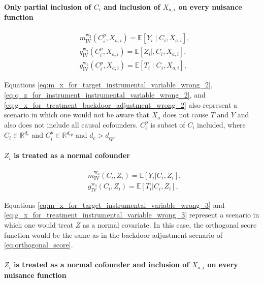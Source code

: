 \documentclass{article}
\numberwithin{equation}{section}
\begin{document}
\paragraph{Only partial inclusion of $C_i$ and inclusion of $X_{a, i}$ on every nuisance function}

\begin{align}
    & m_{\text{IV}}^{\text{w}_2}(C_i^{p}, X_{a, i}) = \mathbb{E}[Y_i \mid C_i, X_{a, i}],
    \label{eq:m_x_for_target_instrumental_variable_wrong_2} \\
    & q_{\text{IV}}^{\text{w}_2}(C_i^{p}, X_{a, i}) = \mathbb{E}[Z_i \mid, C_i, X_{a, i}],
    \label{eq:q_z_for_instrument_instrumental_variable_wrong_2} \\
    & g_{\text{IV}}^{\text{w}_2}(C_i^{p}, X_{a, i}) = \mathbb{E}[T_i \mid C_i, X_{a, i}],
    \label{eq:g_x_for_treatment_instrumental_variable_wrong_2}
\end{align}

Equations \eqref{eq:m_x_for_target_instrumental_variable_wrong_2}, \eqref{eq:q_z_for_instrument_instrumental_variable_wrong_2}, and \eqref{eq:g_x_for_treatment_backdoor_adjustment_wrong_2} also represent a scenario in which one would not be aware that $X_a$ does not cause $T$ and $Y$ and also does not include all causal cofounders. $C^{p}_i$ is subset of $C_i$ included, where $C_i \in \mathbb{R}^{d_c}$ and $C^{p}_i \in \mathbb{R}^{d_{cp}}$ and $d_c > d_{cp}$.

\paragraph{$Z_i$ is treated as a normal cofounder}

\begin{align}
    & m_{\text{IV}}^{\text{w}_3}(C_i, Z_i) = \mathbb{E}[Y_i | C_i, Z_i],
    \label{eq:m_x_for_target_instrumental_variable_wrong_3}
    \\
    & g_{\text{IV}}^{\text{w}_3}(C_i, Z_i) = \mathbb{E}[T_i | C_i, Z_i],
    \label{eq:g_x_for_treatment_instrumental_variable_wrong_3}
\end{align}

Equations \eqref{eq:m_x_for_target_instrumental_variable_wrong_3} and \eqref{eq:g_x_for_treatment_instrumental_variable_wrong_3} represent a scenario in which one would treat $Z$ as a normal covariate. In this case, the orthogonal score function would be the same as in the backdoor adjustment scenario of \eqref{eq:orthogonal_score}.

\paragraph{$Z_i$ is treated as a normal cofounder and inclusion of $X_{a, i}$ on every nuisance function}
\end{document}
